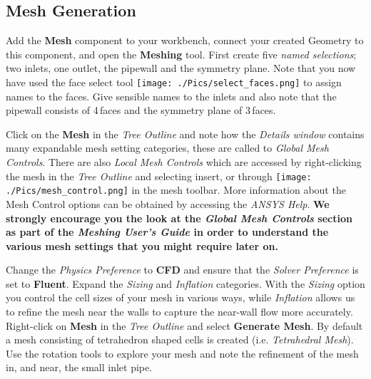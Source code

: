 \documentclass[12pts,a4paper,amsmath,amssymb,floatfix]{article}%
\newcommand\bfr[1]{\textcolor[rgb]{1,0.00,0.00}{\textbf{\textsf{#1}}}}
\begin{document}
\subsection{Mesh Generation}
Add the \bfr{Mesh} component to your workbench, connect your created Geometry to this component, and open the \bfr{Meshing} tool. First create five \emph{named selections}; two inlets, one outlet, the pipewall and the symmetry plane. Note that you now have used the face select tool \texttt{[image: ./Pics/select\_faces.png]} to assign names to the faces. Give sensible names to the inlets and also note that the pipewall consists of 4\,faces and the symmetry plane of 3\,faces.

Click on the \bfr{Mesh} in the \emph{Tree Outline} and note how the \emph{Details window} contains many expandable mesh setting categories, these are called to \emph{Global Mesh Controls}. There are also \emph{Local Mesh Controls} which are accessed by right-clicking the mesh in the \emph{Tree Outline} and selecting insert, or through \texttt{[image: ./Pics/mesh\_control.png]} in the mesh toolbar. More information about the Mesh Control options can be obtained by accessing the \emph{ANSYS Help}. {\bf We strongly encourage you the look at the \emph{Global Mesh Controls} section as part of the \emph{Meshing User's Guide} in order to understand the various mesh settings that you might require later on.}

\medskip

Change the \emph{Physics Preference} to \bfr{CFD} and ensure that the \emph{Solver Preference} is set to \bfr{Fluent}. Expand the \emph{Sizing} and \emph{Inflation} categories. With the \emph{Sizing} option you control the cell sizes of your mesh in various ways, while \emph{Inflation} allows us to refine the mesh near the walls to capture the near-wall flow more accurately. Right-click on \bfr{Mesh} in the \emph{Tree Outline} and select \bfr{Generate Mesh}. By default a mesh consisting of tetrahedron shaped cells is created (i.e. \emph{Tetrahedral Mesh}). Use the rotation tools to explore your mesh and note the refinement of the mesh in, and near, the small inlet pipe.
\end{document}
